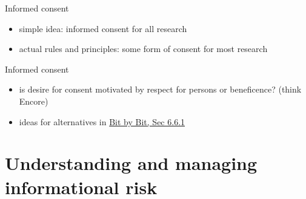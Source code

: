 \documentclass{beamer}
\begin{document}
\begin{frame}{Informed consent}

\begin{itemize}
\item simple idea: informed consent for all research
\item actual rules and principles: some form of consent for most research
\end{itemize}

\end{frame}
\begin{frame}{Informed consent}

\begin{itemize}
\item is desire for consent motivated by respect for persons or beneficence? (think Encore)
\item ideas for alternatives in \href{https://www.bitbybitbook.com/en/1st-ed/preface/}{Bit by Bit, Sec 6.6.1}
\end{itemize}

\end{frame}


\section{Understanding and managing informational risk}
\end{document}
